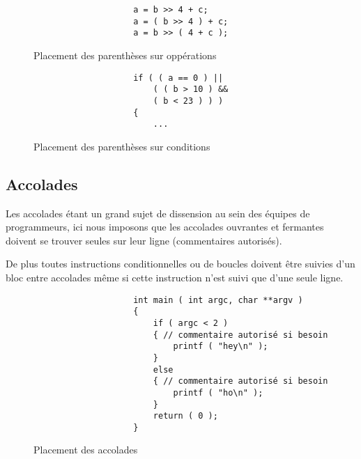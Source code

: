 			\begin{figure}[H]
				\begin{changemargin}{-2.5cm}{-2.5cm}
				\begin{tcolorbox}
				\begin{verbatim}
					a = b >> 4 + c;
					a = ( b >> 4 ) + c;
					a = b >> ( 4 + c );
				\end{verbatim}
				\end{tcolorbox}
				\end{changemargin}
				\caption{Placement des parenthèses sur oppérations}

				\begin{changemargin}{-2.5cm}{-2.5cm}
				\begin{tcolorbox}
				\begin{verbatim}
					if ( ( a == 0 ) ||
					    ( ( b > 10 ) &&
					    ( b < 23 ) ) )
					{
					    ...
				\end{verbatim}
				\end{tcolorbox}
				\end{changemargin}
				\caption{Placement des parenthèses sur conditions}
			\end{figure}

		\subsection{Accolades}
			Les accolades étant un grand sujet de dissension au sein des équipes de programmeurs, ici nous imposons que les accolades ouvrantes et fermantes doivent se trouver seules sur leur ligne (commentaires autorisés).

			De plus toutes instructions conditionnelles ou de boucles doivent être suivies d'un bloc entre accolades même si cette instruction n'est suivi que d'une seule ligne.

			\begin{figure}[H]
				\begin{changemargin}{-2.5cm}{-2.5cm}
				\begin{tcolorbox}
				\begin{verbatim}
					int main ( int argc, char **argv )
					{
					    if ( argc < 2 )
					    { // commentaire autorisé si besoin
					        printf ( "hey\n" );
					    }
					    else
					    { // commentaire autorisé si besoin
					        printf ( "ho\n" );
					    }
					    return ( 0 );
					}
				\end{verbatim}
				\end{tcolorbox}
				\end{changemargin}
				\caption{Placement des accolades}
			\end{figure}

